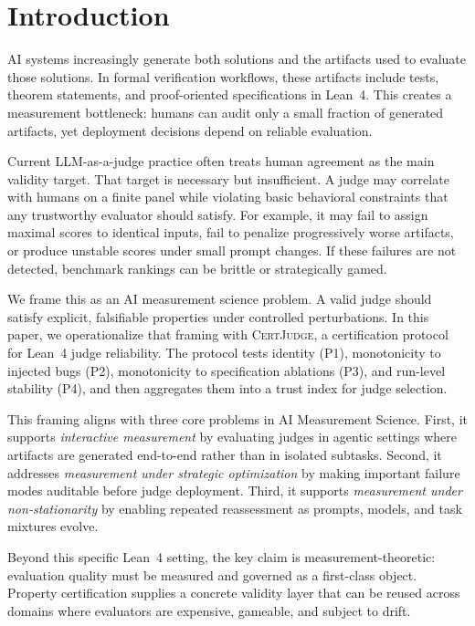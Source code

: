 \section{Introduction}

AI systems increasingly generate both solutions and the artifacts used to evaluate those solutions.
In formal verification workflows, these artifacts include tests, theorem statements, and proof-oriented specifications in Lean~4.
This creates a measurement bottleneck: humans can audit only a small fraction of generated artifacts, yet deployment decisions depend on reliable evaluation.

Current LLM-as-a-judge practice often treats human agreement as the main validity target.
That target is necessary but insufficient.
A judge may correlate with humans on a finite panel while violating basic behavioral constraints that any trustworthy evaluator should satisfy.
For example, it may fail to assign maximal scores to identical inputs, fail to penalize progressively worse artifacts, or produce unstable scores under small prompt changes.
If these failures are not detected, benchmark rankings can be brittle or strategically gamed.

We frame this as an AI measurement science problem.
A valid judge should satisfy explicit, falsifiable properties under controlled perturbations.
In this paper, we operationalize that framing with \textsc{CertJudge}, a certification protocol for Lean~4 judge reliability.
The protocol tests identity (P1), monotonicity to injected bugs (P2), monotonicity to specification ablations (P3), and run-level stability (P4), and then aggregates them into a trust index for judge selection.

This framing aligns with three core problems in AI Measurement Science.
First, it supports \emph{interactive measurement} by evaluating judges in agentic settings where artifacts are generated end-to-end rather than in isolated subtasks.
Second, it addresses \emph{measurement under strategic optimization} by making important failure modes auditable before judge deployment.
Third, it supports \emph{measurement under non-stationarity} by enabling repeated reassessment as prompts, models, and task mixtures evolve.

Beyond this specific Lean~4 setting, the key claim is measurement-theoretic:
evaluation quality must be measured and governed as a first-class object.
Property certification supplies a concrete validity layer that can be reused across domains where evaluators are expensive, gameable, and subject to drift.


